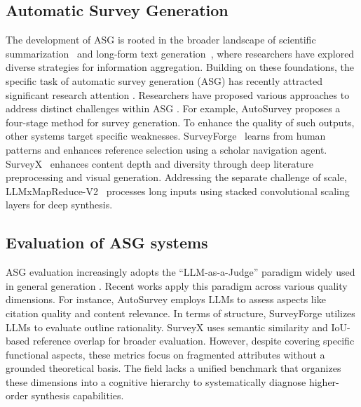 \documentclass[11pt]{article}
\begin{document}
\subsection{Automatic Survey Generation}
The development of ASG is rooted in the broader landscape of scientific summarization~\cite{hoang2010towards, hu2014automatic, chen2019automatic, Wang2019paperrobot, lu2020multi, jin2020multi, xing2020automatic} and long-form text generation~\cite{fan2018hierarchical, bosselut2018discourse, cho2019towards, mao2022dyle, kryscinski2022booksum, chang2024booookscore}, where researchers have
explored diverse strategies for information aggregation. Building on these foundations, the specific task of automatic survey generation (ASG) has recently attracted significant research attention \cite{jha2015content, sun2019automatic, huang2021autosurvey, shao2024assisting}. Researchers have proposed various approaches to address distinct challenges within ASG \cite{hu2024hireview, zhu2023hierarchical}.
For example, AutoSurvey \cite{wang2024autosurvey} proposes a four-stage method for survey generation. To enhance the quality of such outputs, other systems target specific weaknesses. SurveyForge~\cite{yan2025surveyforge} learns from human patterns and enhances reference selection using a scholar navigation agent. SurveyX~\cite{liang2025surveyx} enhances content depth and diversity through deep literature preprocessing and visual generation. Addressing the separate challenge of scale, LLMxMapReduce-V2~\cite{wang2025llmmapreducev2} processes long inputs using stacked convolutional scaling layers for deep synthesis.


\subsection{Evaluation of ASG systems}
ASG evaluation increasingly adopts the ``LLM-as-a-Judge'' paradigm widely used in general generation \cite{zheng2023judging,wu2025writingbench,chen2025mlrbench}. Recent works apply this paradigm across various quality dimensions. For instance, AutoSurvey \cite{wang2024autosurvey} employs LLMs to assess aspects like citation quality and content relevance. In terms of structure, SurveyForge \cite{yan2025surveyforge} utilizes LLMs to evaluate outline rationality. SurveyX \cite{liang2025surveyx} uses semantic similarity and IoU-based reference overlap for broader evaluation. However, despite covering specific functional aspects, these metrics focus on fragmented attributes without a grounded theoretical basis. The field lacks a unified benchmark that organizes these dimensions into a cognitive hierarchy to systematically diagnose higher-order synthesis capabilities.
\end{document}
